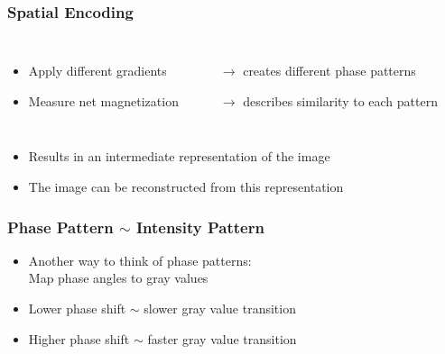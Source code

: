 \begin{frame}
	\frametitle{Spatial Encoding}
	
	\begin{columns}[onlytextwidth,c]
		{\small
		\begin{itemize}
			\item Apply different gradients
			\item Measure net magnetization
		\end{itemize}}
		{\small
		\begin{itemize}
			\item[$\rightarrow$] creates different phase patterns
			\item[$\rightarrow$] describes similarity to each pattern
		\end{itemize}}
	\end{columns}
	\begin{center}
		
	\end{center}
	
	\vspace{-2ex}
	
	\begin{itemize}
		\item Results in an intermediate representation of the image
		\item The image can be reconstructed from this representation
	\end{itemize}
\end{frame}

\begin{frame}
	\frametitle{Phase Pattern $\sim$ Intensity Pattern}
	
	\begin{itemize}
		\item Another way to think of phase patterns: \\
		Map phase angles to gray values
	\end{itemize}
	
	\begin{center}
		\begingroup
		
		
		
		\endgroup
	\end{center}
	
	\begin{itemize}
		\item Lower phase shift $\sim$ slower gray value transition
		\item Higher phase shift $\sim$ faster gray value transition
	\end{itemize}
\end{frame}

